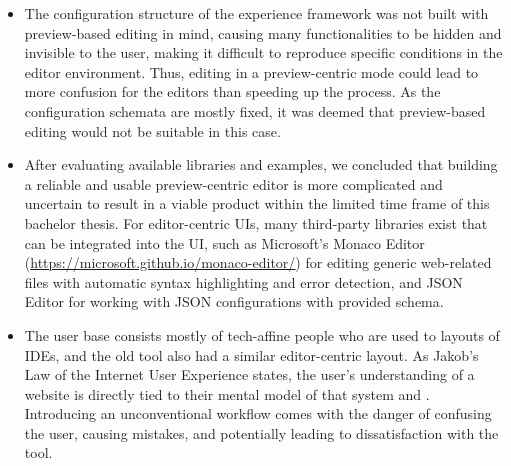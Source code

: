 \begin{itemize}
  \item The configuration structure of the \Gls{experience} framework was not built with preview-based editing in mind, causing many functionalities to be hidden and invisible to the user, making it difficult to reproduce specific conditions in the editor environment.
  Thus, editing in a preview-centric mode could lead to more confusion for the editors than speeding up the process.
  As the configuration schemata are mostly fixed, it was deemed that preview-based editing would not be suitable in this case.
  \item After evaluating available libraries and examples, we concluded that building a reliable and usable preview-centric editor is more complicated and uncertain to result in a viable product within the limited time frame of this bachelor thesis.
  For editor-centric UIs, many third-party libraries exist that can be integrated into the UI, such as Microsoft's Monaco Editor (\url{https://microsoft.github.io/monaco-editor/}) for editing generic web-related files with automatic syntax highlighting and error detection, and JSON Editor for working with JSON configurations with provided schema.
  \item The user base consists mostly of tech-affine people who are used to layouts of IDEs, and the old tool also had a similar editor-centric layout.
  As Jakob's Law of the Internet User Experience states, the user's understanding of a website is directly tied to their mental model of that system \cite{Nielsen:2000} and \cite[p. 2]{LawsOfUX:2020ys}. Introducing an unconventional workflow comes with the danger of confusing the user, causing mistakes, and potentially leading to dissatisfaction with the tool.
 
\end{itemize}

